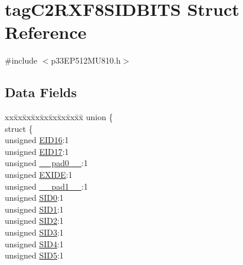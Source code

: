 \hypertarget{structtag_c2_r_x_f8_s_i_d_b_i_t_s}{}\section{tag\+C2\+R\+X\+F8\+S\+I\+D\+B\+I\+TS Struct Reference}
\label{structtag_c2_r_x_f8_s_i_d_b_i_t_s}


{\ttfamily \#include $<$p33\+E\+P512\+M\+U810.\+h$>$}

\subsection*{Data Fields}
\begin{DoxyCompactItemize}
\item 
\begin{tabbing}
xx\=xx\=xx\=xx\=xx\=xx\=xx\=xx\=xx\=\kill
union \{\\
\>struct \{\\
\>\>unsigned \hyperlink{structtag_c2_r_x_f8_s_i_d_b_i_t_s_a6dd5663b0c9838c56db040560ca0efa1}{EID16}:1\\
\>\>unsigned \hyperlink{structtag_c2_r_x_f8_s_i_d_b_i_t_s_aa648615464b0eb29967529333eee9fd9}{EID17}:1\\
\>\>unsigned \hyperlink{structtag_c2_r_x_f8_s_i_d_b_i_t_s_adf71f3d8410c1f1dbbc96680a92c49af}{\_\_pad0\_\_}:1\\
\>\>unsigned \hyperlink{structtag_c2_r_x_f8_s_i_d_b_i_t_s_a09ff1c1be3927220bd3dfbc10edfe243}{EXIDE}:1\\
\>\>unsigned \hyperlink{structtag_c2_r_x_f8_s_i_d_b_i_t_s_acaf2d0924a107ec6e8d2e31febaf66f9}{\_\_pad1\_\_}:1\\
\>\>unsigned \hyperlink{structtag_c2_r_x_f8_s_i_d_b_i_t_s_a1ca276ac15df60e1f7b9a6d0011ade93}{SID0}:1\\
\>\>unsigned \hyperlink{structtag_c2_r_x_f8_s_i_d_b_i_t_s_a3405d354f81391f879648f69f504dfc8}{SID1}:1\\
\>\>unsigned \hyperlink{structtag_c2_r_x_f8_s_i_d_b_i_t_s_ad744966dfc49307f731b7045b01b94e5}{SID2}:1\\
\>\>unsigned \hyperlink{structtag_c2_r_x_f8_s_i_d_b_i_t_s_a9345f3e64720be93e83d8dfc827f3f45}{SID3}:1\\
\>\>unsigned \hyperlink{structtag_c2_r_x_f8_s_i_d_b_i_t_s_aefb106fed4bb40e2c3c71ac612c554e3}{SID4}:1\\
\>\>unsigned \hyperlink{structtag_c2_r_x_f8_s_i_d_b_i_t_s_a0f221b3c9612231686bf87ccdcec8489}{SID5}:1\\

\end{tabbing}
\end{DoxyCompactItemize}
